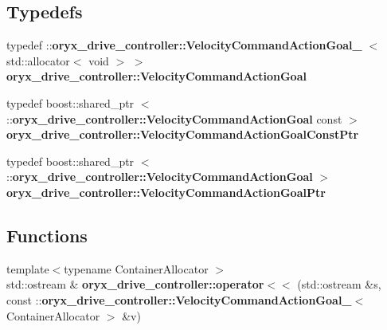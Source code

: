 \subsection*{\-Typedefs}
\begin{DoxyCompactItemize}
\item 
typedef \*
\-::{\bf oryx\-\_\-drive\-\_\-controller\-::\-Velocity\-Command\-Action\-Goal\-\_\-}\*
$<$ std\-::allocator$<$ void $>$ $>$ {\bf oryx\-\_\-drive\-\_\-controller\-::\-Velocity\-Command\-Action\-Goal}
\item 
typedef boost\-::shared\-\_\-ptr\*
$<$ \-::{\bf oryx\-\_\-drive\-\_\-controller\-::\-Velocity\-Command\-Action\-Goal} \*
const  $>$ {\bf oryx\-\_\-drive\-\_\-controller\-::\-Velocity\-Command\-Action\-Goal\-Const\-Ptr}
\item 
typedef boost\-::shared\-\_\-ptr\*
$<$ \-::{\bf oryx\-\_\-drive\-\_\-controller\-::\-Velocity\-Command\-Action\-Goal} $>$ {\bf oryx\-\_\-drive\-\_\-controller\-::\-Velocity\-Command\-Action\-Goal\-Ptr}
\end{DoxyCompactItemize}
\subsection*{\-Functions}
\begin{DoxyCompactItemize}
\item 
{\footnotesize template$<$typename Container\-Allocator $>$ }\\std\-::ostream \& {\bf oryx\-\_\-drive\-\_\-controller\-::operator$<$$<$} (std\-::ostream \&s, const \-::{\bf oryx\-\_\-drive\-\_\-controller\-::\-Velocity\-Command\-Action\-Goal\-\_\-}$<$ \-Container\-Allocator $>$ \&v)
\end{DoxyCompactItemize}
